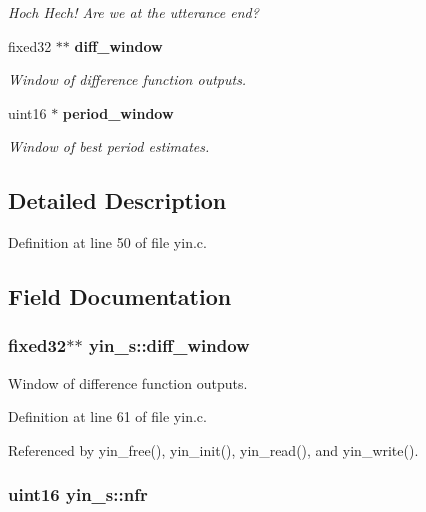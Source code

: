 \begin{DoxyCompactItemize}
\begin{DoxyCompactList}\small\item\em \-Hoch \-Hech! \-Are we at the utterance end? \end{DoxyCompactList}\item 
fixed32 $\ast$$\ast$ {\bf diff\-\_\-window}
\begin{DoxyCompactList}\small\item\em \-Window of difference function outputs. \end{DoxyCompactList}\item 
uint16 $\ast$ {\bf period\-\_\-window}
\begin{DoxyCompactList}\small\item\em \-Window of best period estimates. \end{DoxyCompactList}\end{DoxyCompactItemize}


\subsection{\-Detailed \-Description}


\-Definition at line 50 of file yin.\-c.



\subsection{\-Field \-Documentation}
\subsubsection[{diff\-\_\-window}]{\setlength{\rightskip}{0pt plus 5cm}fixed32$\ast$$\ast$ {\bf yin\-\_\-s\-::diff\-\_\-window}}\label{structyin__s_a932e8441ff0aa6b9b37f5055c97a4d11}


\-Window of difference function outputs. 



\-Definition at line 61 of file yin.\-c.



\-Referenced by yin\-\_\-free(), yin\-\_\-init(), yin\-\_\-read(), and yin\-\_\-write().

\subsubsection[{nfr}]{\setlength{\rightskip}{0pt plus 5cm}uint16 {\bf yin\-\_\-s\-::nfr}}\label{structyin__s_af4f11d14a36bbdc19863fa8335237423}


